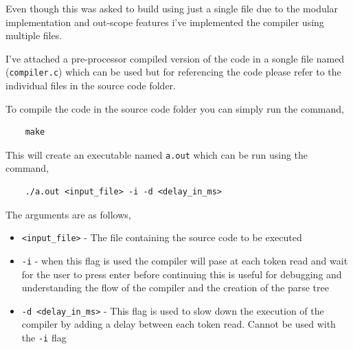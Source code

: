 \documentclass[12pt,a4paper]{article}
\begin{document}
Even though this was asked to build using just a single file due to the modular implementation and out-scope features i've implemented the compiler using multiple files. 

I've attached a pre-processor compiled version of the code in a songle file named (\texttt{compiler.c}) which can be used but for referencing the code please refer to the individual files in the source code folder.

To compile the code in the source code folder you can simply run the command,
\begin{verbatim}
    make
\end{verbatim}

This will create an executable named \texttt{a.out} which can be run using the command,
\begin{verbatim}
    ./a.out <input_file> -i -d <delay_in_ms>
\end{verbatim}

The arguments are as follows,
\begin{itemize}
    \item \texttt{<input\_file>} - The file containing the source code to be executed
    \item \texttt{-i} - when this flag is used the compiler will pase at each token read and wait for the user to press enter before continuing this is useful for debugging and understanding the flow of the compiler and the creation of the parse tree
    \item \texttt{-d <delay\_in\_ms>} - This flag is used to slow down the execution of the compiler by adding a delay between each token read. Cannot be used with the \texttt{-i} flag
\end{itemize}
\end{document}
